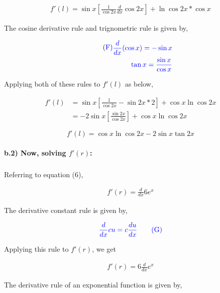 \documentclass[a4paper]{report}
\begin{document}
\begin{align*}
    f'(l)= \sin x [ \frac{1}{\cos 2x} \frac{d}{dx}\cos 2x] + \ln \cos 2x *\cos x
\end{align*}

The cosine derivative rule and trignometric rule is given by,

\begin{align*} \tag{\color{blue} F}
    \begin{split} 
        \color{blue} \frac{d}{dx}(\cos x) = -\sin x 
    \end{split}\\
    \begin{split}
        \color{blue} \tan x = \frac{\sin x}{\cos x}
    \end{split}
\end{align*}

Applying both of these rules to $f'(l)$ as below,

\begin{align*}
    f'(l)&=\sin x [ \frac{1}{\cos 2x} -\sin 2x*2] + \cos x\ln \cos 2x \\
        &=-2\sin x [ \frac{\sin 2x}{\cos 2x}] + \cos x\ln \cos 2x 
\end{align*}

\begin{equation}
    f'(l)=\cos x\ln \cos 2x-2\sin x \tan 2x
\end{equation}

\paragraph{b.2) Now, solving $f'(r)$:}

\subparagraph{}

Referring to equation (6),

\begin{align*}
    f'(r)=\frac{d}{dx}6{e^x}
\end{align*}


The derivative constant rule is given by,

\begin{equation*}
    \color{blue} \frac{d}{dx}{cu} = c\frac{du}{dx} \tag{G}
\end{equation*}

Applying this rule to $f'(r)$, we get

\begin{align*}
    f'(r)=6 \frac{d}{dx}e^x
\end{align*}


The derivative rule of an exponential function is given by,
\end{document}
